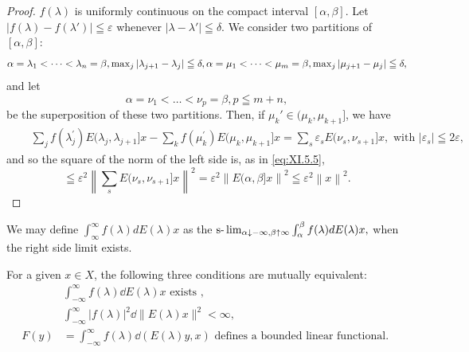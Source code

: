 \begin{proof}
 $f(\lambda)$ is uniformly continuous on the compact interval $[\alpha, \beta]$. Let $|f(\lambda) - f(\lambda')| \leqq \varepsilon$ whenever $|\lambda - \lambda'| \leqq \delta$. We consider two partitions of $[\alpha, \beta]$: 
\begin{equation}\alpha = \lambda_{1} < \dots < \lambda_{n} = \beta , \max\limits _{j} | \lambda_{j+1} - \lambda_{j} | \leqq \delta , \alpha = \mu_{1} < \dots < \mu_{m} = \beta , \max\limits _{j} | \mu_{j+1} - \mu_{j} | \leqq \delta , \notag\end{equation}
and let 
\[
\alpha = \nu_{1} < \dots < \nu_{p} = \beta , p \leqq m + n,
\]
be the superposition of these two partitions. Then, if $\mu_k' \in (\mu_k, \mu_{k+1}]$, we have 
\[
\begin{aligned}
&\quad \sum\limits_{j} f (\lambda_{j} ^{\prime}) E (\lambda_{j}, \lambda_{j+1} ] x - \sum\limits_{k} f (\mu_{k} ^{\prime}) E (\mu_{k}, \mu_{k+1} ] x = \sum\limits_{s} \varepsilon_{s} E (\nu_{s}, \nu_{s+1} ] x, \text{ with } | \varepsilon_{s} | \leqq 2 \varepsilon ,
\end{aligned}
\]
and so the square of the norm of the left side is, as in \eqref{eq:XI.5.5}, 
\[
\leqq \varepsilon^{2} \left\| \sum\limits_{s} E (\nu_{s}, \nu_{s+1} ] x \right\| ^{2} = \varepsilon^{2} \left\| E (\alpha , \beta ] x \right\| ^{2} \leqq \varepsilon^{2} \left\| x \right\| ^{2}. \]
\end{proof}

\begin{corollaryu} We may define $\int_{\infty}^{\infty}f(\lambda)dE(\lambda)x$ as the $\slim\limits_{\alpha \downarrow -\infty ,\beta \uparrow \infty}\int_{\alpha}^{\beta}f(\lambda)dE(\lambda)x,$ 
when the right side limit exists. 
\end{corollaryu}

\begin{theorem}\label{thm:XI.5.Theorem.1} For a given $x \in X$, the following three conditions are mutually equivalent: 
\begin{align}
&\int_{- \infty} ^{\infty} f (\lambda) \dd E (\lambda) x \text{ exists }, \label{eq:XI.5.6} \\
&\int_{- \infty} ^{\infty} | f (\lambda) | ^{2} \dd \| E (\lambda) x \| ^{2} < \infty , \label{eq:XI.5.7} \\
F (y)& = \int_{- \infty} ^{\infty} f (\lambda) \dd (E (\lambda) y, x) \text{ defines a bounded linear functional. } \label{eq:XI.5.8}
\end{align}
\end{theorem}

